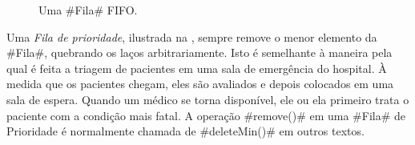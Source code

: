 \begin{figure}
	\caption[Uma Fila FIFO]{Uma #Fila# FIFO.}
\end{figure}

Uma \emph{Fila de prioridade},
%
%
%
ilustrada na , sempre remove o menor elemento da #Fila#,
quebrando os laços arbitrariamente. Isto é semelhante à maneira pela qual é
feita a triagem de pacientes em uma sala de emergência do hospital. À medida que
os pacientes chegam, eles são avaliados e depois colocados em uma sala de
espera. Quando um médico se torna disponível, ele ou ela primeiro trata o
paciente com a condição mais fatal. A operação #remove()# em uma #Fila# de
Prioridade é normalmente chamada de #deleteMin()# em outros textos.

